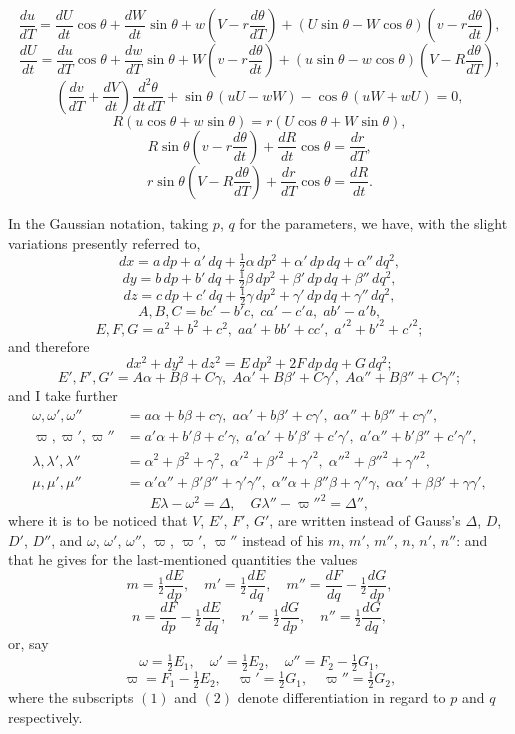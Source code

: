 \documentclass[11pt]{article}
\begin{document}
\[
\frac{du}{dT}=\frac{dU}{dt}\cos\theta+\frac{dW}{dt}\sin\theta+w\!\left(V-r\frac{d\theta}{dT}\right)+(U\sin\theta-W\cos\theta)\!\left(v-r\frac{d\theta}{dt}\right),
\]
\[
\frac{dU}{dt}=\frac{du}{dT}\cos\theta+\frac{dw}{dT}\sin\theta+W\!\left(v-r\frac{d\theta}{dt}\right)+(u\sin\theta-w\cos\theta)\!\left(V-R\frac{d\theta}{dT}\right),
\]
\[
\left(\frac{dv}{dT}+\frac{dV}{dt}\right)\frac{d^2\theta}{dt\,dT}+\sin\theta\,(uU-wW)-\cos\theta\,(uW+wU)=0,
\]
\[
R(u\cos\theta+w\sin\theta)=r(U\cos\theta+W\sin\theta),
\]
\[
R\sin\theta\!\left(v-r\frac{d\theta}{dt}\right)+\frac{dR}{dt}\cos\theta=\frac{dr}{dT},
\]
\[
r\sin\theta\!\left(V-R\frac{d\theta}{dT}\right)+\frac{dr}{dT}\cos\theta=\frac{dR}{dt}.
\]

In the Gaussian notation, taking $p$, $q$ for the parameters, we have, with the slight variations presently referred to,
\[
dx = a\,dp + a'\,dq + \tfrac12\alpha\,dp^2 + \alpha'\,dp\,dq + \alpha''\,dq^2,
\]
\[
dy = b\,dp + b'\,dq + \tfrac12\beta\,dp^2 + \beta'\,dp\,dq + \beta''\,dq^2,
\]
\[
dz = c\,dp + c'\,dq + \tfrac12\gamma\,dp^2 + \gamma'\,dp\,dq + \gamma''\,dq^2,
\]
\[
A, B, C = bc'-b'c,\; ca'-c'a,\; ab'-a'b,
\]
\[
E, F, G = a^2+b^2+c^2,\; aa'+bb'+cc',\; a'^2+b'^2+c'^2;
\]
and therefore
\[
dx^2+dy^2+dz^2 = E\,dp^2 + 2F\,dp\,dq + G\,dq^2;
\]
\[
E', F', G' = A\alpha+B\beta+C\gamma,\; A\alpha'+B\beta'+C\gamma',\; A\alpha''+B\beta''+C\gamma'';
\]
and I take further
\begin{align*}
\omega,\omega',\omega'' &= a\alpha+b\beta+c\gamma,\; a\alpha'+b\beta'+c\gamma',\; a\alpha''+b\beta''+c\gamma'',\\
\varpi,\varpi',\varpi'' &= a'\alpha+b'\beta+c'\gamma,\; a'\alpha'+b'\beta'+c'\gamma',\; a'\alpha''+b'\beta''+c'\gamma'',\\
\lambda,\lambda',\lambda'' &= \alpha^2+\beta^2+\gamma^2,\; \alpha'^2+\beta'^2+\gamma'^2,\; \alpha''^2+\beta''^2+\gamma''^2,\\
\mu,\mu',\mu'' &= \alpha'\alpha''+\beta'\beta''+\gamma'\gamma'',\; \alpha''\alpha+\beta''\beta+\gamma''\gamma,\; \alpha\alpha'+\beta\beta'+\gamma\gamma',
\end{align*}
\[
E\lambda-\omega^2 = \Delta,\quad G\lambda''-\varpi''^2 = \Delta'',
\]
where it is to be noticed that $V$, $E'$, $F'$, $G'$, are written instead of Gauss's $\Delta$, $D$, $D'$, $D''$, and $\omega$, $\omega'$, $\omega''$, $\varpi$, $\varpi'$, $\varpi''$ instead of his $m$, $m'$, $m''$, $n$, $n'$, $n''$: and that he gives for the last-mentioned quantities the values
\[
m = \tfrac12\frac{dE}{dp},\quad m' = \tfrac12\frac{dE}{dq},\quad m'' = \frac{dF}{dq}-\tfrac12\frac{dG}{dp},
\]
\[
n = \frac{dF}{dp}-\tfrac12\frac{dE}{dq},\quad n' = \tfrac12\frac{dG}{dp},\quad n'' = \tfrac12\frac{dG}{dq},
\]
or, say
\[
\omega = \tfrac12 E_1,\quad \omega' = \tfrac12 E_2,\quad \omega'' = F_2-\tfrac12 G_1,
\]
\[
\varpi = F_1-\tfrac12 E_2,\quad \varpi' = \tfrac12 G_1,\quad \varpi'' = \tfrac12 G_2,
\]
where the subscripts $(1)$ and $(2)$ denote differentiation in regard to $p$ and $q$ respectively.
\end{document}
